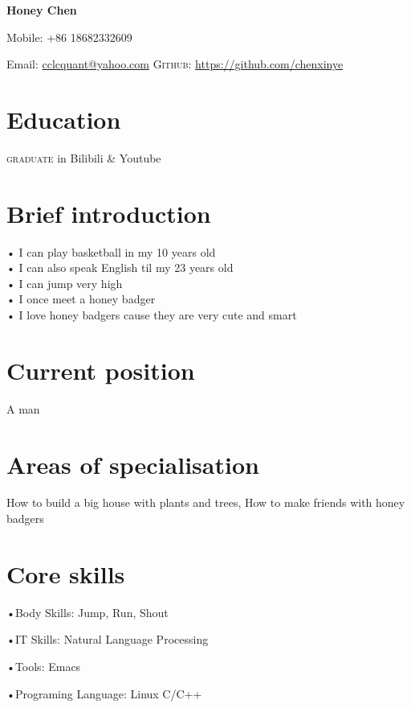 \documentclass[11pt]{article}
\begin{document}
{\LARGE\bfseries Honey Chen}
\bigskip\medskip

\medskip

Mobile: +86 18682332609
\medskip

Email: \href{mailto:cclcquant@yahoo.com}{cclcquant@yahoo.com}
\textsc{Github}: \href{https://github.com/chenxinye}{https://github.com/chenxinye}

\section*{Education}
\textsc{graduate} in Bilibili \& Youtube


\section*{Brief introduction}
• I can play basketball in my 10 years old\\
• I can also speak English til my 23 years old\\
• I can jump very high\\
• I once meet a honey badger\\
• I love honey badgers cause they are very cute and smart


\section*{Current position}
A man


\section*{Areas of specialisation}
How to build a big house with plants and trees, How to make friends with honey badgers


\section*{Core skills}
•Body Skills: Jump, Run, Shout
\vspace{0.01\textheight}

•IT Skills: Natural Language Processing
\vspace{0.01\textheight}

•Tools: Emacs

\vspace{0.01\textheight}

•Programing Language: Linux C/C++
\vspace{0.01\textheight}
\end{document}
